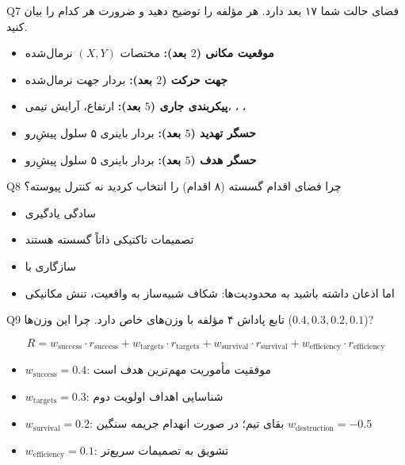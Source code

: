 \documentclass[oneside,openany,a4paper,12pt]{article}
\newcommand{\dqn}{\lr{DQN}}
\begin{document}
\begin{questionbox}{Q7}
فضای حالت شما ۱۷ بعد دارد. هر مؤلفه را توضیح دهید و ضرورت هر کدام را بیان کنید.
\end{questionbox}

\begin{hintbox}
\begin{itemize}
  \item \textbf{موقعیت مکانی ($2$ بعد):} مختصات $(X, Y)$ نرمال‌شده
  \item \textbf{جهت حرکت ($2$ بعد):} بردار جهت نرمال‌شده
  \item \textbf{پیکربندی جاری ($5$ بعد):} ارتفاع، آرایش تیمی، ، ، 
  \item \textbf{حسگر تهدید ($5$ بعد):} بردار باینری ۵ سلول پیشِ‌رو
  \item \textbf{حسگر هدف ($5$ بعد):} بردار باینری ۵ سلول پیشِ‌رو
\end{itemize}
\end{hintbox}

\begin{questionbox}{Q8}
چرا فضای اقدام گسسته (۸ اقدام) را انتخاب کردید نه کنترل پیوسته؟
\end{questionbox}

\begin{hintbox}
\begin{itemize}
  \item سادگی یادگیری
  \item تصمیمات تاکتیکی ذاتاً گسسته هستند
  \item سازگاری با \dqn{}
  \item اما اذعان داشته باشید به محدودیت‌ها: شکاف شبیه‌ساز به واقعیت، تنش مکانیکی
\end{itemize}
\end{hintbox}

\begin{questionbox}{Q9}
تابع پاداش ۴ مؤلفه با وزن‌های خاص دارد. چرا این وزن‌ها ($0.4, 0.3, 0.2, 0.1$)?
\end{questionbox}

\begin{hintbox}
\begin{equation}
R = w_{\text{success}} \cdot r_{\text{success}} + w_{\text{targets}} \cdot r_{\text{targets}} + w_{\text{survival}} \cdot r_{\text{survival}} + w_{\text{efficiency}} \cdot r_{\text{efficiency}}
\end{equation}

\begin{itemize}
  \item $w_{\text{success}} = 0.4$: موفقیت مأموریت مهم‌ترین هدف است
  \item $w_{\text{targets}} = 0.3$: شناسایی اهداف اولویت دوم
  \item $w_{\text{survival}} = 0.2$: بقای تیم؛ در صورت انهدام جریمه سنگین $w_{\text{destruction}} = -0.5$
  \item $w_{\text{efficiency}} = 0.1$: تشویق به تصمیمات سریع‌تر
\end{itemize}
\end{hintbox}
\end{document}
